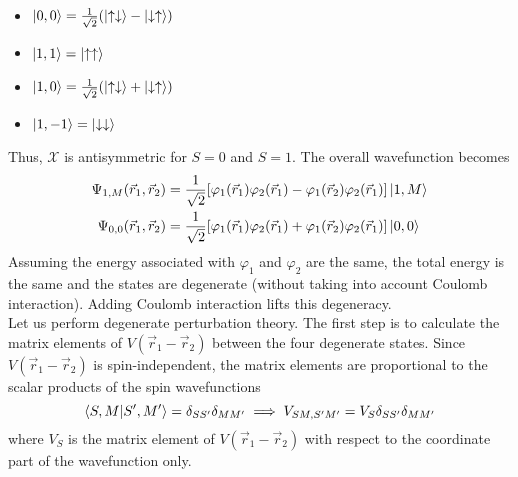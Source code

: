 \documentclass[12pt,a4paper,titlepage]{article}
\newcommand{\up}{\uparrow} %
\newcommand{\dn}{\downarrow} %
\newcommand{\Chi}{\mathcal{X}} %
\begin{document}
\begin{itemize}
\item $\ket{0,0}=\frac{1}{\sqrt{2}}(\ket{\up\dn}-\ket{\dn\up})$
\item $\ket{1,1}=\ket{\up\up}$
\item $\ket{1,0}=\frac{1}{\sqrt{2}}(\ket{\up\dn}+\ket{\dn\up})$
\item $\ket{1,-1}=\ket{\dn\dn}$
\end{itemize}
Thus, $\Chi$ is antisymmetric for $S=0$ and $S=1$. The overall wavefunction becomes
\begin{equation}
\begin{aligned}
\Psi_{1,M}(\vec{r}_{1},\vec{r}_{2})&=\frac{1}{\sqrt{2}}[\varphi_{1}(\vec{r}_{1})\varphi_{2}(\vec{r}_{1})-\varphi_{1}(\vec{r}_{2})\varphi_{2}(\vec{r}_{1})]\ket{1,M}\\
\Psi_{0,0}(\vec{r}_{1},\vec{r}_{2})&=\frac{1}{\sqrt{2}}[\varphi_{1}(\vec{r}_{1})\varphi_{2}(\vec{r}_{1})+\varphi_{1}(\vec{r}_{2})\varphi_{2}(\vec{r}_{1})]\ket{0,0}\\
\end{aligned}
\end{equation}
Assuming the energy associated with $\varphi_{1}$ and $\varphi_{2}$ are the same, the total energy is the same and the states are degenerate (without taking into account Coulomb interaction). Adding Coulomb interaction lifts this degeneracy.\\

Let us perform degenerate perturbation theory. The first step is to calculate the matrix elements of $V(\vec{r}_{1}-\vec{r}_{2})$ between the four degenerate states. Since $V(\vec{r}_{1}-\vec{r}_{2})$ is spin-independent, the matrix elements are proportional to the scalar products of the spin wavefunctions
\begin{equation}
\braket{S,M}{S',M'}=\delta_{SS'}\delta_{MM'}\implies V_{SM,S'M'}=V_{S}\delta_{SS'}\delta_{MM'}
\end{equation}
where $V_{S}$ is the matrix element of $V(\vec{r}_{1}-\vec{r}_{2})$ with respect to the coordinate part of the wavefunction only.
\end{document}
